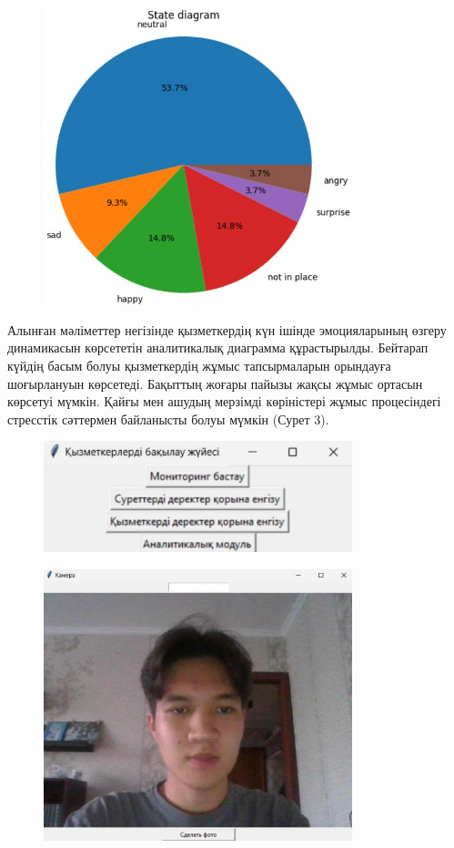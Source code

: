 \begin{figure}[H]
	\centering
	\includegraphics[width=0.8\textwidth]{media/ict2/image159}
	\caption*{}
\end{figure}

Алынған мәліметтер негізінде қызметкердің күн ішінде эмоцияларының
өзгеру динамикасын көрсететін аналитикалық диаграмма құрастырылды.
Бейтарап күйдің басым болуы қызметкердің жұмыс тапсырмаларын орындауға
шоғырлануын көрсетеді. Бақыттың жоғары пайызы жақсы жұмыс ортасын
көрсетуі мүмкін. Қайғы мен ашудың мерзімді көріністері жұмыс
процесіндегі стресстік сәттермен байланысты болуы мүмкін (Сурет 3).

\begin{figure}[H]
	\centering
	\includegraphics[width=0.8\textwidth]{media/ict2/image160}
	\caption*{}
\end{figure}

\begin{figure}[H]
	\centering
	\includegraphics[width=0.8\textwidth]{media/ict2/image161}
	\caption*{}
\end{figure}

